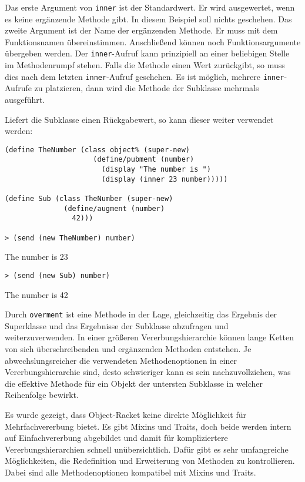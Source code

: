 Das erste Argument von \texttt{inner} ist der Standardwert. Er wird ausgewertet, wenn es keine ergänzende Methode gibt. In diesem Beispiel soll nichts geschehen. Das zweite Argument ist der Name der ergänzenden Methode. Er muss mit dem Funktionsnamen übereinstimmen. Anschließend können noch Funktionsargumente übergeben werden. Der \texttt{inner}-Aufruf kann prinzipiell an einer beliebigen Stelle im Methodenrumpf stehen. Falls die Methode einen Wert zurückgibt, so muss dies nach dem letzten \texttt{inner}-Aufruf geschehen. Es ist möglich, mehrere \texttt{inner}-Aufrufe zu platzieren, dann wird die Methode der Subklasse mehrmals ausgeführt. 

Liefert die Subklasse einen Rückgabewert, so kann dieser weiter verwendet werden:

\begin{lstlisting}
(define TheNumber (class object% (super-new)
                     (define/pubment (number)
                       (display "The number is ")
                       (display (inner 23 number)))))

(define Sub (class TheNumber (super-new)
              (define/augment (number)
                42)))
                
> (send (new TheNumber) number)
\end{lstlisting}
{\routput The number is 23}

\begin{lstlisting}
> (send (new Sub) number)
\end{lstlisting}
{\routput The number is 42}

Durch \texttt{overment} ist eine Methode in der Lage, gleichzeitig das Ergebnis der Superklasse und das Ergebnisse der Subklasse abzufragen und weiterzuverwenden. In einer größeren Vererbungshierarchie können  lange Ketten von sich überschreibenden und ergänzenden Methoden entstehen. Je abwechslungsreicher die verwendeten Methodenoptionen in einer Vererbungshierarchie sind, desto schwieriger kann es sein nachzuvollziehen, was die effektive Methode für ein Objekt der untersten Subklasse in welcher Reihenfolge bewirkt.

Es wurde gezeigt, dass Object-Racket keine direkte Möglichkeit für Mehrfachvererbung bietet. Es gibt Mixins und Traits, doch beide werden intern auf Einfachvererbung abgebildet und damit für kompliziertere Vererbungshierarchien schnell unübersichtlich. Dafür gibt es sehr umfangreiche Möglichkeiten, die Redefinition und Erweiterung von Methoden zu kontrollieren. Dabei sind alle  Methodenoptionen kompatibel mit Mixins und Traits. 

